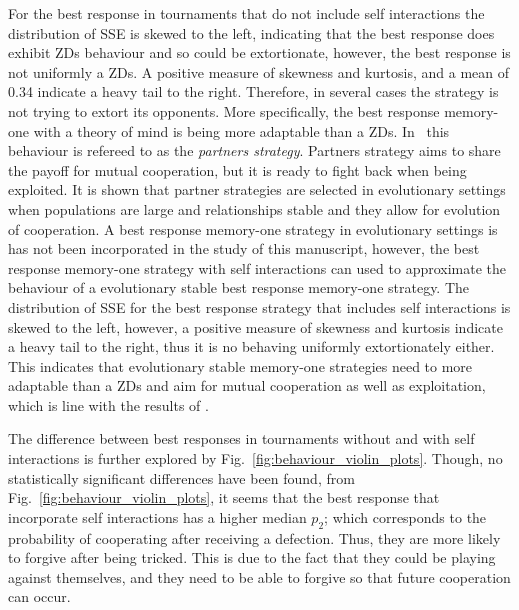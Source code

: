 \documentclass[10pt]{article}
\begin{document}
For the best response in tournaments that do not include self interactions the
distribution of SSE is skewed to the left, indicating that the best response
does exhibit ZDs behaviour and so could be extortionate, however, the best
response is not uniformly a ZDs. A positive measure of skewness and kurtosis,
and a mean of 0.34 indicate a heavy tail to the right. Therefore, in several
cases the strategy is not trying to extort its opponents. More specifically,
the best response memory-one with a theory of mind is being more adaptable than a ZDs.
In~\cite{Hilbe2018} this behaviour is refereed to as the \textit{partners
strategy}. Partners
strategy aims to share the payoff for mutual cooperation, but it is ready
to fight back when being exploited. It is shown that partner strategies are
selected in evolutionary settings when populations are large and relationships
stable and they allow for evolution of cooperation. A best response memory-one strategy
in evolutionary settings is has not been incorporated in the study of this manuscript, however,
the best response memory-one strategy with self interactions can used to approximate
the behaviour of a evolutionary stable best response memory-one strategy.
The distribution of SSE for the best response strategy that includes self
interactions is skewed to the left, however, a positive measure
of skewness and kurtosis indicate a heavy tail to the right, thus it is
no behaving uniformly extortionately either. This indicates that evolutionary
stable memory-one strategies need to more adaptable than a ZDs and aim for
mutual cooperation as well as exploitation, which is line with the results of
\cite{Hilbe2018}.

The difference between best responses in tournaments without and with self interactions
is further explored by Fig.~\ref{fig:behaviour_violin_plots}.
Though, no statistically significant differences have been found, from
Fig.~\ref{fig:behaviour_violin_plots}, it seems that the best
response that incorporate self interactions has a higher median $p_2$; which corresponds to the probability of cooperating
after receiving a defection. Thus, they are more likely to forgive after
being tricked. This is due to the fact that they could be playing against
themselves, and they need to be able to forgive so that future cooperation can
occur.
\end{document}
